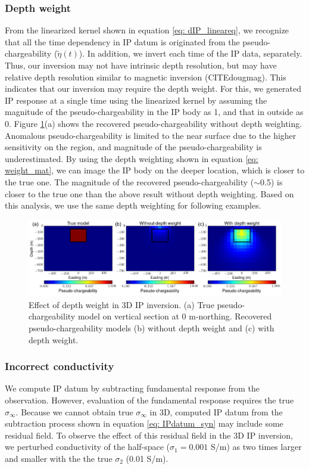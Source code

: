 \documentclass[a4paper, 11pt]{article}
\newcommand{\siginf}{\sigma_\infty}
\newcommand{\peta}{\tilde{\eta}}
\begin{document}
\subsubsection{Depth weight}
From the linearized kernel shown in equation \ref{eq: dIP_lineareq}, we recognize that all the time dependency in IP datum is originated from the pseudo-chargeability ($\peta(t)$). 
In addition, we invert each time of the IP data, separately. 
Thus, our inversion may not have intrinsic depth resolution, but may have relative depth resolution similar to magnetic inversion (CITEdougmag). 
This indicates that our inversion may require the depth weight. 
For this, we generated IP response at a single time using the linearized kernel by assuming the magnitude of the pseudo-chargeability in the IP body as 1, and that in outside as 0. 
Figure \ref{F:Depthweight}(a) shows the recovered pseudo-chargeability without depth weighting. 
Anomalous pseudo-chargeability is limited to the near surface due to the higher sensitivity on the region, and magnitude of the pseudo-chargeability is underestimated. 
By using the depth weighting shown in equation \ref{eq: weight_mat}, we can image the IP body on the deeper location, which is closer to the true one. 
The magnitude of the recovered pseudo-chargeability ($\sim$0.5) is closer to the true one than the above result without depth weighting. 
Based on this analysis, we use the same depth weighting for following examples. 

\begin{figure}[htb]
  \centering
  \includegraphics[width=1.\textwidth]{figures/Depthweight.png}
  \caption{Effect of depth weight in 3D IP inversion. (a) True pseudo-chargeability model on vertical section at 0 m-northing. Recovered pseudo-chargeability models (b) without depth weight and (c) with depth weight.}
  \label{F:Depthweight}
\end{figure}
\clearpage

\subsubsection{Incorrect conductivity}
We compute IP datum by subtracting fundamental response from the observation. 
However, evaluation of the fundamental response requires the true $\siginf$. 
Because we cannot obtain true $\siginf$ in 3D, computed IP datum from the subtraction process shown in equation \ref{eq: IPdatum_syn} may include some residual field. 
To observe the effect of this residual field in the 3D IP inversion, we perturbed conductivity of the half-space ($\sigma_1=0.001$ S/m) as two times larger and smaller with the the true $\sigma_2$ (0.01 S/m).
\end{document}

